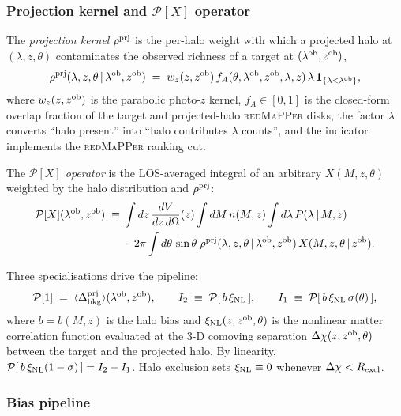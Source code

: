 \documentclass[a4paper, 11pt]{article}
\newcommand{\lob}{\lambda^{\rm ob}}
\newcommand{\zob}{z^{\rm ob}}
\newcommand{\dprj}{\Delta^{\rm prj}}
\newcommand{\xinl}{\xi_{\rm NL}}
\newcommand{\Pop}{\mathcal{P}}
\newcommand{\rhoprj}{\rho^{\rm prj}}
\newcommand{\avg}[1]{\langle #1 \rangle}
\begin{document}
\subsubsection{Projection kernel and \texorpdfstring{$\Pop[X]$}{P[X]} operator}

The \emph{projection kernel} $\rhoprj$ is the per-halo weight with
which a projected halo at $(\lambda,z,\theta)$ contaminates the
observed richness of a target at $(\lob,\zob)$,
\begin{equation}
\rhoprj(\lambda,z,\theta\,|\,\lob,\zob) \;=\;
w_z(z,\zob)\,f_A(\theta,\lob,\zob,\lambda,z)\,\lambda\,
\mathbf{1}_{\{\lambda<\lob\}} ,
\label{eq:rho_prj}
\end{equation}
where $w_z(z,\zob)$ is the parabolic photo-$z$ kernel,
$f_A\in[0,1]$ is the closed-form overlap fraction of the target and
projected-halo \textsc{redMaPPer} disks, the factor $\lambda$ converts
``halo present'' into ``halo contributes $\lambda$ counts'', and the
indicator implements the \textsc{redMaPPer} ranking cut.

The \emph{$\Pop[X]$ operator} is the LOS-averaged integral of an
arbitrary $X(M,z,\theta)$ weighted by the halo distribution and
$\rhoprj$:
\begin{equation}
\begin{aligned}
\Pop[X](\lob,\zob) \;\equiv\;
&\int dz\,\frac{dV}{dz\,d\Omega}(z)
 \int dM\,n(M,z)
 \int d\lambda\,P(\lambda\,|\,M,z) \\
&{}\cdot\;2\pi\int d\theta\,\sin\theta\;
 \rhoprj(\lambda,z,\theta\,|\,\lob,\zob)\,X(M,z,\theta\,|\,\zob) .
\end{aligned}
\label{eq:Pop}
\end{equation}

Three specialisations drive the pipeline:
\begin{equation}
\Pop[1] \;=\; \avg{\dprj_{\rm bkg}}(\lob,\zob),\qquad
I_2 \;\equiv\; \Pop[\,b\,\xinl\,],\qquad
I_1 \;\equiv\; \Pop[\,b\,\xinl\,\sigma(\theta)\,],
\label{eq:Pop_specs}
\end{equation}
where $b=b(M,z)$ is the halo bias and $\xinl(z,\zob,\theta)$ is the
nonlinear matter correlation function evaluated at the 3-D comoving
separation $\Delta\chi(z,\zob,\theta)$ between the target and the
projected halo.  By linearity, $\Pop[\,b\,\xinl(1-\sigma)\,]=I_2-I_1$.
Halo exclusion sets $\xinl\equiv 0$ whenever $\Delta\chi<R_{\rm excl}$.

\subsubsection{Bias pipeline}
\label{sec:pipeline}
\end{document}
